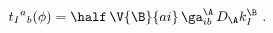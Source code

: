 \begin{equation} \label{t-matrix}
  {t_I}^a{}_b(\phi) =\half\, \V{\B}{ai}\, \ga^\A_{ib}\, D_\A k^\B_I\ .
 \end{equation}

